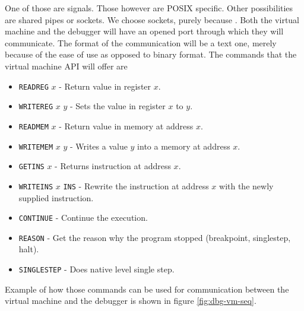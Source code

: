 One of those are signals. Those however are POSIX specific. Other possibilities
are shared pipes or sockets. We choose sockets, purely because . Both the virtual machine and the debugger
will have an opened port through which they will communicate. The format
of the communication will be a text one, merely because of the ease of use
as opposed to binary format. The commands that the virtual machine API
will offer are
\begin{itemize}
    \item \texttt{READREG} $x$ - Return value in register $x$.
    \item \texttt{WRITEREG} $x$ $y$ - Sets the value in register $x$ to $y$.
    \item \texttt{READMEM} $x$ - Return value in memory at address $x$.
    \item \texttt{WRITEMEM} $x$ $y$ - Writes a value $y$ into a memory at address $x$.
    \item \texttt{GETINS} $x$ - Returns instruction at address $x$.
    \item \texttt{WRITEINS} $x$ \texttt{INS} - Rewrite the instruction at address
    $x$ with the newly supplied instruction.
    \item \texttt{CONTINUE} - Continue the execution.
    \item \texttt{REASON} - Get the reason why the program stopped (breakpoint, singlestep, halt).
    \item \texttt{SINGLESTEP} - Does native level single step.
\end{itemize}
Example of how those commands can be used for communication between the virtual
machine and the debugger is shown in figure \ref{fig:dbg-vm-seq}.

